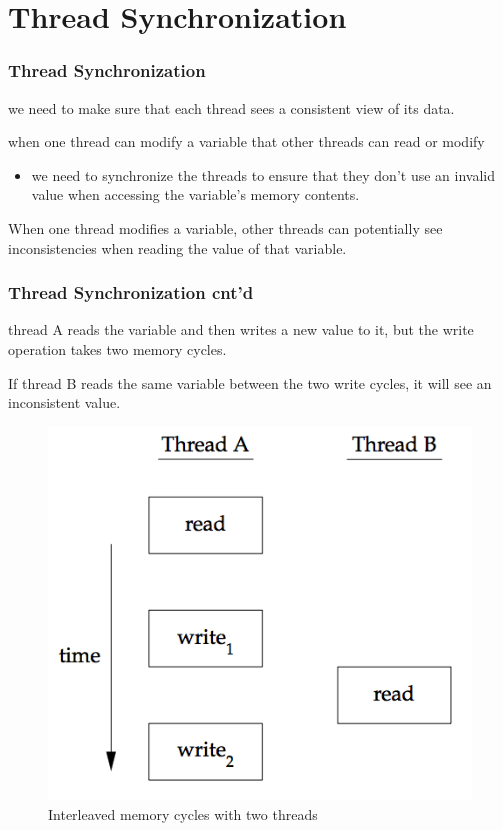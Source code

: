 \documentclass[newPxFont,sthlmFooter,nooffset]{beamer}
\begin{document}
\section{Thread Synchronization}
\begin{frame}[t]
  \frametitle{Thread Synchronization}
we need to make sure that each thread sees a consistent view of its data. 

when one thread can modify a variable that other threads can read or
modify
\begin{itemize}
\item we need to synchronize the threads to ensure that
  they don’t use an invalid value when accessing the variable’s memory
  contents. 
\end{itemize}
When one thread modifies a variable, other threads can
  potentially see inconsistencies when reading the value of that  variable. 
  
\end{frame}

\begin{frame}[t]
  \frametitle{Thread Synchronization cnt'd}
thread A reads the variable and then writes a new value to
  it, but the write operation takes two memory cycles.

If thread B reads the same variable between the two write cycles, it will see an inconsistent value.

  \begin{figure}[h]
    \centering
    \includegraphics[width=0.4\linewidth]{figure/fig11-7}
    \caption{Interleaved memory cycles with two threads}
    \label{fig:work}
  \end{figure}  


\end{frame}
\end{document}
